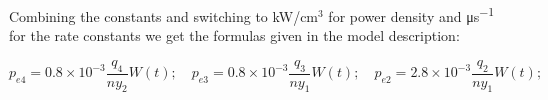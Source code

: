 \documentclass{report}
\begin{document}
\begin{appendices}
Combining the constants and switching to kW/cm$^3$ for power density and \si{\micro\second^{-1}} for the rate constants we get the formulas given in the model description:

\begin{equation*}
p_{e4} = 0.8\times 10^{-3} \frac{q_4}{n y_2} W(t);\quad p_{e3} = 0.8\times 10^{-3}\frac{q_3}{n y_1} W(t);\quad p_{e2} = 2.8\times 10^{-3}\frac{q_2}{n y_1} W(t);
\end{equation*}







\end{appendices}



                          

\printbibliography

%
%
                          
\end{document}
